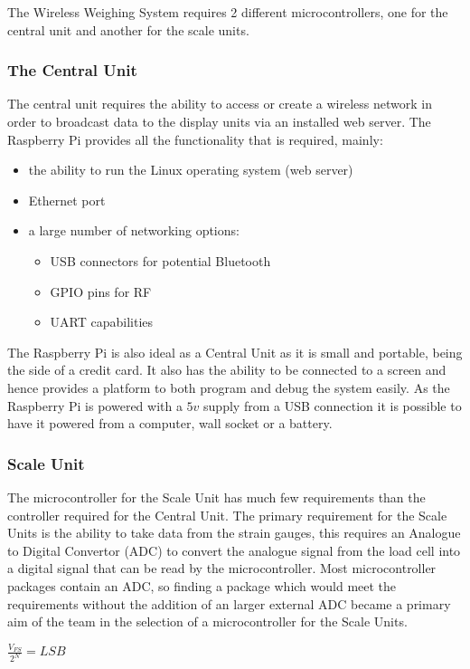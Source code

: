 The Wireless Weighing System requires 2 different microcontrollers, one for the central unit and another for the scale units. 
\subsubsection{The Central Unit}
The central unit requires the ability to access or create a wireless network in order to broadcast data to the display units via an installed web server. The Raspberry Pi provides all the functionality that is required, mainly:
	\begin{itemize}
		\item the ability to run the Linux operating system (web server)
		\item Ethernet port
		\item a large number of networking options:
			\begin{itemize} 
				\item USB connectors for potential Bluetooth
				\item GPIO pins for RF
				\item UART capabilities
			\end{itemize}
	\end{itemize}
The Raspberry Pi is also ideal as a Central Unit as it is small and portable, being the side of a credit card. It also has the ability to be connected to a screen and hence provides a platform to both program and debug the system easily. As the Raspberry Pi is powered with a $5v$ supply from a USB connection it is possible to have it powered from a computer, wall socket or a battery.

\subsubsection{Scale Unit}
The microcontroller for the Scale Unit has much few requirements than the controller required for the Central Unit. The primary requirement for the Scale Units is the ability to take data from the strain gauges, this requires an Analogue to Digital Convertor (ADC) to convert the analogue signal from the load cell into a digital signal that can be read by the microcontroller. Most microcontroller packages contain an ADC, so finding a package which would meet the requirements without the addition of an larger external ADC became a primary aim of the team in the selection of a microcontroller for the Scale Units. 

\centerline{\(\frac{V_{FS}}{2^{N}} = LSB  \)}
\label{LSBeq}

